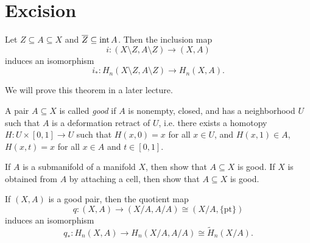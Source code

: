 \section{Excision}

\begin{theorem}[Excision]\label{thm:excision}
  Let $Z \subseteq A \subseteq X$ and
  $\overline{Z} \subseteq \operatorname{int} A$. Then the
  inclusion map
  \[
    i : (X \setminus Z, A \setminus Z) \to (X, A)
  \]
  induces an isomorphism
  \[
    i_* : H_n(X \setminus Z, A \setminus Z) \to H_n(X, A).
  \]
\end{theorem}

\begin{remark}
  We will prove this theorem in a later lecture.
\end{remark}

\begin{definition}
  A pair $A \subseteq X$ is called
  \emph{good} if $A$ is nonempty, closed, and has
  a neighborhood $U$ such that
  $A$ is a deformation retract of $U$, i.e.
  there exists a homotopy $H : U \times [0, 1] \to U$
  such that $H(x, 0) = x$ for all $x \in U$, and
  $H(x, 1) \in A$,
  $H(x, t) = x$ for all $x \in A$ and $t \in [0, 1]$.
\end{definition}

\begin{exercise}
  If $A$ is a submanifold of a manifold $X$, then
  show that $A \subseteq X$ is good.
  If $X$ is obtained from $A$ by attaching a cell,
  then show that $A \subseteq X$ is good.
\end{exercise}

\begin{theorem}
  If $(X, A)$ is a good pair, then
  the quotient map
  \[q : (X, A) \to (X/A, A/A) \cong (X / A, \{\mathrm{pt}\})\]
  induces an isomorphism
  \[q_* : H_n(X, A) \to H_n(X/A, A/A) \cong \widetilde{H}_n(X / A).\]
\end{theorem}


